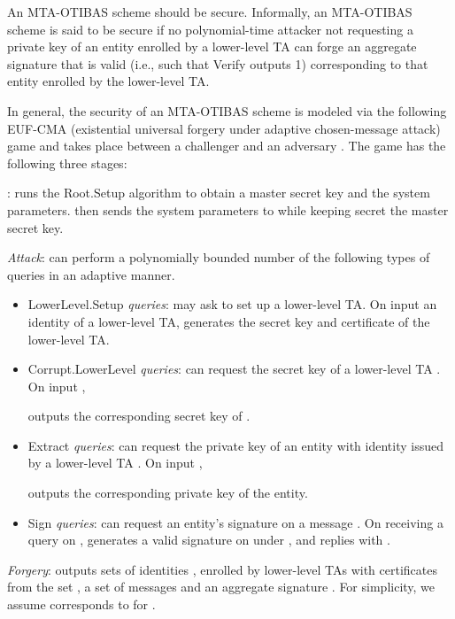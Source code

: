 \documentclass[10pt,journal,compsoc]{IEEEtran}
\begin{document}
An MTA-OTIBAS scheme should be secure.
Informally, an MTA-OTIBAS scheme is said to be secure if no
polynomial-time attacker not requesting a private key of an entity
enrolled by a lower-level TA can forge an aggregate signature that
is valid
 (i.e., such that {\sf Verify} outputs 1) corresponding to that entity
enrolled by the lower-level TA.

In general, the security of an MTA-OTIBAS scheme is modeled via the following EUF-CMA (existential
universal forgery under adaptive chosen-message attack) game
\cite{Gentry} and takes place between a challenger 
and an adversary . The game has the following three
stages:

\smallskip
{}:  runs the {\sf Root.Setup}
algorithm to obtain a master secret key and the system parameters.
 then sends the system parameters to 
while keeping secret the master secret key.

\medskip
\noindent \emph{Attack}:  can perform a polynomially
bounded number of the following types of queries in an adaptive
manner.
\begin{itemize}
  \item {\sf LowerLevel.Setup} \emph{queries}:  may
  ask  to set up a lower-level TA. On input an
  identity  of a lower-level TA,
     generates the secret key and certificate of the lower-level TA.

  \item {\sf Corrupt.LowerLevel} \emph{queries}:  can request the
    secret key of a lower-level TA . On input
    ,
    
    outputs the corresponding secret key of .

  \item {\sf Extract} \emph{queries}:  can request the
    private key of an entity with identity  issued by a lower-level TA .
    On input ,
    
    outputs the corresponding private key of the entity.

  \item {\sf Sign} \emph{queries}:  can
    request an entity's signature on a message .
    On receiving a query on ,
     generates a valid
    signature  on  under ,
    and replies with .
\end{itemize}

\noindent \emph{Forgery}:  outputs  sets of
identities  ,
  enrolled by
 lower-level TAs with certificates from the set
, a set of
 messages  and an aggregate signature
. For simplicity, we assume  corresponds to
 for .
\end{document}
